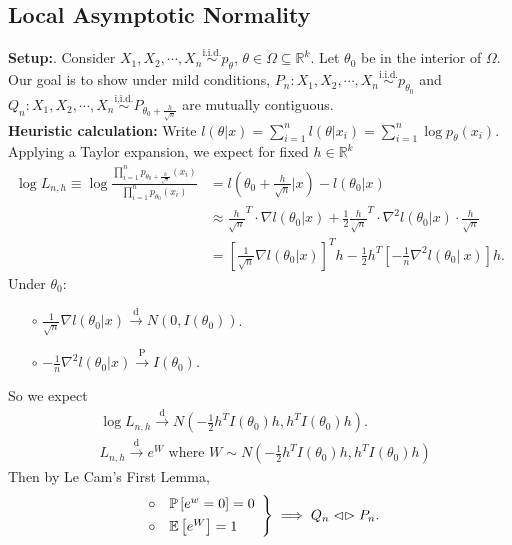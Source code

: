 \documentclass[a4paper]{article}
\begin{document}
\subsection{Local Asymptotic Normality}

\textbf{Setup:}. Consider $X_1,X_2,\cdots,X_n \stackrel{\text{i.i.d.}}{\sim} p_\theta$, $\theta \in \Omega \subseteq \mathbb{R}^k$. Let $\theta_0$ be in the interior of $\Omega$. Our goal is to show under mild conditions, $P_n: X_1,X_2,\cdots,X_n \stackrel{\text{i.i.d.}}{\sim} p_{\theta_0}$ and $Q_n: X_1,X_2,\cdots,X_n \stackrel{\text{i.i.d.}}{\sim} P_{\theta_0+\frac{h}{\sqrt{n}}}$ are mutually contiguous. \\

\noindent \textbf{Heuristic calculation:} Write $l(\theta|x) = \sum\limits_{i=1}^n l(\theta|x_i) = \sum\limits_{i=1}^n \log p_{\theta}(x_i)$. Applying a Taylor expansion, we expect for fixed $h \in \mathbb{R}^k$
\begin{equation*}
	\begin{aligned}
		\log L_{n,h} \equiv \log \frac{\prod\limits_{i=1}^n p_{\theta_0 + \frac{h}{\sqrt{n}}} (x_i)}{\prod\limits_{i=1}^n p_{\theta_0} (x_i)} &= l(\theta_0 + \frac{h}{\sqrt{n}} | x) - l(\theta_0 | x) \\
		&\approx \frac{h}{\sqrt{n}}^T \cdot \nabla l(\theta_0|x) + \frac{1}{2} \frac{h}{\sqrt{n}}^T \cdot \nabla^2 l(\theta_0 |x) \cdot \frac{h}{\sqrt{n}} \\
		&= \left[\frac{1}{\sqrt{n}} \nabla l(\theta_0|x) \right]^T h - \frac{1}{2}h^T \left[-\frac{1}{n}\nabla^2 l(\theta_0 | \ x)\right] h.
	\end{aligned}
\end{equation*}
Under $\theta_0$:
\begin{itemize}
	\item[$\circ$] $\frac{1}{\sqrt{n}} \nabla l(\theta_0|x) \stackrel{\text{d}}{\longrightarrow} N(0,I(\theta_0))$.
	\item[$\circ$] $-\frac{1}{n}\nabla^2l(\theta_0|x) \stackrel{\text{P}}{\longrightarrow} I(\theta_0)$.
\end{itemize}
So we expect 
\begin{equation*}
	\begin{aligned}
		& \log L_{n,h} \stackrel{\text{d}}{\longrightarrow} N\left(-\frac{1}{2}h^TI(\theta_0)h,h^TI(\theta_0)h\right). \\
		& L_{n,h} \stackrel{\text{d}}{\longrightarrow} e^W \text{ where } W \sim N\left(-\frac{1}{2}h^TI(\theta_0)h,h^TI(\theta_0)h\right)
	\end{aligned}
\end{equation*}
Then by Le Cam’s First Lemma,
\begin{equation*}
	\left. \begin{array}{l}
		\circ \quad \mathbb{P} \left[e^w = 0\right] = 0 \vspace{1ex} \\
		\circ \quad \mathbb{E} \left[e^W\right] = 1
	\end{array} \right\} \implies Q_n \vartriangleleft \vartriangleright P_n.
\end{equation*}
\end{document}
